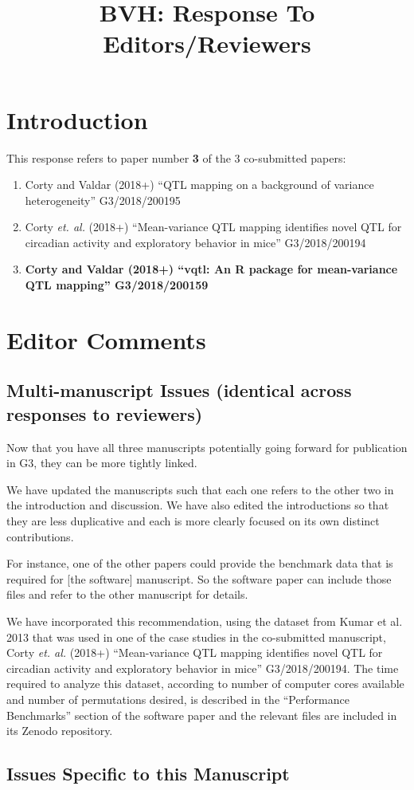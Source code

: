 \documentclass[11pt]{article}
\title{BVH: Response To Editors/Reviewers}
\newcommand{\EditorQuestion}[1]{
  \vspace{5pt}\goodbreak
  \noindent\fbox{Editor:} #1
  \normalfont\par
}
\newcommand{\Response}[1]{
  \goodbreak
  \textcolor{blue!50!black}{#1}
  \normalfont\par
}
\newcommand{\CortyRPaper}{Corty and Valdar (2018+) ``vqtl: An R package for mean-variance QTL mapping'' G3/2018/200159\xspace}
\newcommand{\CortyReanalysisPaper}{Corty \emph{et. al.} (2018+) ``Mean-variance QTL mapping identifies novel QTL for circadian activity and exploratory behavior in mice'' G3/2018/200194\xspace}
\newcommand{\CortyMethodsPaper}{Corty and Valdar (2018+) ``QTL mapping on a background of variance heterogeneity'' G3/2018/200195\xspace}
\begin{document}
\reversemarginpar

\section*{Introduction}

This response refers to paper number \textbf{3} of the 3 co-submitted papers:
\begin{enumerate}
\item \CortyMethodsPaper
\item \CortyReanalysisPaper
\item \textbf{\CortyRPaper}
\end{enumerate}

\section*{Editor Comments}

\subsection*{Multi-manuscript Issues (identical across responses to reviewers)}

\EditorQuestion{
  Now that you have all three manuscripts potentially going forward for publication in G3, they can be more tightly linked.
}
\Response{
  We have updated the manuscripts such that each one refers to the other two in the introduction and discussion. We have also edited the introductions so that they are less duplicative and each is more clearly focused on its own distinct contributions.
}

\EditorQuestion{
   For instance, one of the other papers could provide the benchmark data that is required for [the software] manuscript.
   So the software paper can include those files and refer to the other manuscript for details.
}
\Response{
  We have incorporated this recommendation, using the dataset from Kumar et al. 2013 that was used in one of the case studies in the co-submitted manuscript, \CortyReanalysisPaper.
  The time required to analyze this dataset, according to number of computer cores available and number of permutations desired, is described in the ``Performance Benchmarks'' section of the software paper and the relevant files are included in its Zenodo repository.
}

\subsection*{Issues Specific to this Manuscript}
\end{document}
